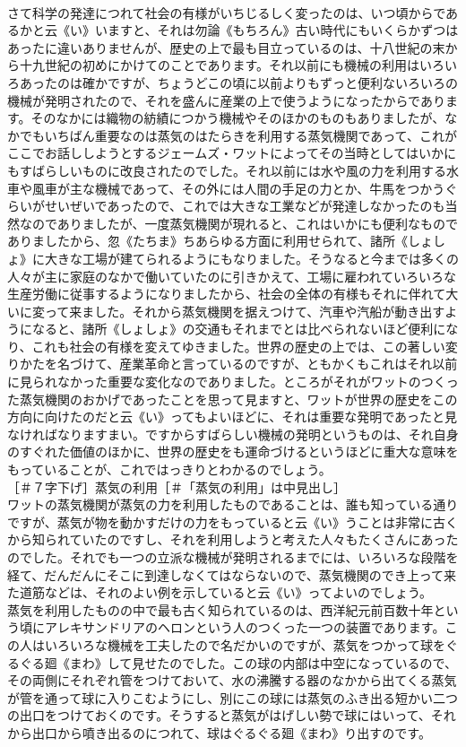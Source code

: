 \documentclass[8pt]{extreport}
\begin{document}
\begin{CJK}{UTF8}{min}
\\	さて科学の発達につれて社会の有様がいちじるしく変ったのは、いつ頃からであるかと云《い》いますと、それは勿論《もちろん》古い時代にもいくらかずつはあったに違いありませんが、歴史の上で最も目立っているのは、十八世紀の末から十九世紀の初めにかけてのことであります。それ以前にも機械の利用はいろいろあったのは確かですが、ちょうどこの頃に以前よりもずっと便利ないろいろの機械が発明されたので、それを盛んに産業の上で使うようになったからであります。そのなかには織物の紡績につかう機械やそのほかのものもありましたが、なかでもいちばん重要なのは蒸気のはたらきを利用する蒸気機関であって、これがここでお話ししようとするジェームズ・ワットによってその当時としてはいかにもすばらしいものに改良されたのでした。それ以前には水や風の力を利用する水車や風車が主な機械であって、その外には人間の手足の力とか、牛馬をつかうぐらいがせいぜいであったので、これでは大きな工業などが発達しなかったのも当然なのでありましたが、一度蒸気機関が現れると、これはいかにも便利なものでありましたから、忽《たちま》ちあらゆる方面に利用せられて、諸所《しょしょ》に大きな工場が建てられるようにもなりました。そうなると今までは多くの人々が主に家庭のなかで働いていたのに引きかえて、工場に雇われていろいろな生産労働に従事するようになりましたから、社会の全体の有様もそれに伴れて大いに変って来ました。それから蒸気機関を据えつけて、汽車や汽船が動き出すようになると、諸所《しょしょ》の交通もそれまでとは比べられないほど便利になり、これも社会の有様を変えてゆきました。世界の歴史の上では、この著しい変りかたを名づけて、産業革命と言っているのですが、ともかくもこれはそれ以前に見られなかった重要な変化なのでありました。ところがそれがワットのつくった蒸気機関のおかげであったことを思って見ますと、ワットが世界の歴史をこの方向に向けたのだと云《い》ってもよいほどに、それは重要な発明であったと見なければなりますまい。ですからすばらしい機械の発明というものは、それ自身のすぐれた価値のほかに、世界の歴史をも運命づけるというほどに重大な意味をもっていることが、これではっきりとわかるのでしょう。
\\	［＃７字下げ］蒸気の利用［＃「蒸気の利用」は中見出し］
\\	ワットの蒸気機関が蒸気の力を利用したものであることは、誰も知っている通りですが、蒸気が物を動かすだけの力をもっていると云《い》うことは非常に古くから知られていたのですし、それを利用しようと考えた人々もたくさんにあったのでした。それでも一つの立派な機械が発明されるまでには、いろいろな段階を経て、だんだんにそこに到達しなくてはならないので、蒸気機関のでき上って来た道筋などは、それのよい例を示していると云《い》ってよいのでしょう。
\\	蒸気を利用したものの中で最も古く知られているのは、西洋紀元前百数十年という頃にアレキサンドリアのヘロンという人のつくった一つの装置であります。この人はいろいろな機械を工夫したので名だかいのですが、蒸気をつかって球をぐるぐる廻《まわ》して見せたのでした。この球の内部は中空になっているので、その両側にそれぞれ管をつけておいて、水の沸騰する器のなかから出てくる蒸気が管を通って球に入りこむようにし、別にこの球には蒸気のふき出る短かい二つの出口をつけておくのです。そうすると蒸気がはげしい勢で球にはいって、それから出口から噴き出るのにつれて、球はぐるぐる廻《まわ》り出すのです。

\end{CJK}
\end{document}

